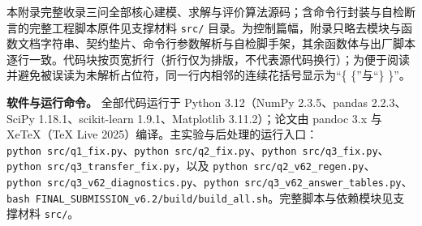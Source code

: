 \documentclass[11pt,a4paper]{article}
\begin{document}
本附录完整收录三问全部核心建模、求解与评价算法源码；含命令行封装与自检断言的完整工程脚本原件见支撑材料
\texttt{src/}
目录。为控制篇幅，附录只略去模块与函数文档字符串、契约垫片、命令行参数解析与自检脚手架，其余函数体与出厂脚本逐行一致。代码块按页宽折行（折行仅为排版，不代表源代码换行）；为便于阅读并避免被误读为未解析占位符，同一行内相邻的连续花括号显示为``\{
\{''与``\} \}''。

\textbf{软件与运行命令。} 全部代码运行于 Python 3.12（NumPy
2.3.5、pandas 2.2.3、SciPy 1.18.1、scikit-learn 1.9.1、Matplotlib
3.11.2）；论文由 pandoc 3.x 与 XeTeX（TeX Live
2025）编译。主实验与后处理的运行入口：\texttt{python\ src/\allowbreak{}q1\_fix.py}、\texttt{python\ src/\allowbreak{}q2\_fix.py}、\texttt{python\ src/\allowbreak{}q3\_fix.py}、\texttt{python\ src/\allowbreak{}q3\_transfer\_fix.py}，以及
\texttt{python\ src/\allowbreak{}q2\_v62\_regen.py}、\texttt{python\ src/\allowbreak{}q3\_v62\_diagnostics.py}、\texttt{python\ src/\allowbreak{}q3\_v62\_answer\_tables.py}、\texttt{bash\ FINAL\_SUBMISSION\_v6.2/\allowbreak{}build/\allowbreak{}build\_all.sh}。完整脚本与依赖模块见支撑材料
\texttt{src/}。


\end{document}
